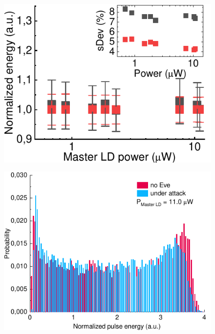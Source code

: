 \begin{figure}%
	\includegraphics[width=\textwidth]{images/area_under_attack.pdf}
	\caption{}
\end{figure}
\label{fig:area}

\begin{figure}
	\includegraphics[width=\textwidth]{images/hist_attack_11.pdf}
	\caption{}
\end{figure}


